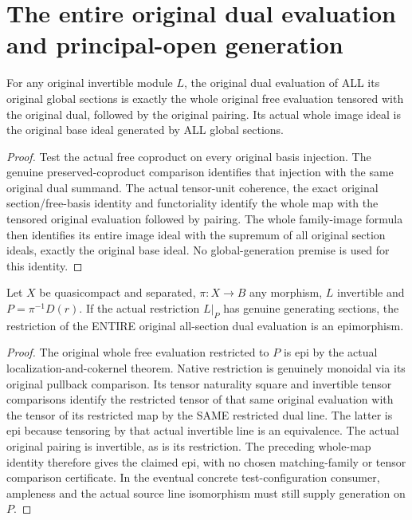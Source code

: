 \section{The entire original dual evaluation and principal-open generation}

\begin{lemma}
\label{lem:all-section-dual-evaluation}
\leanok
{}
For any original invertible module $L$, the original dual evaluation
of ALL its original global sections is exactly the whole original
free evaluation tensored with the original dual, followed by the
original pairing. Its actual whole image ideal is the original
base ideal generated by ALL global sections.
\end{lemma}
\begin{proof}
Test the actual free coproduct on every original basis injection.
The genuine preserved-coproduct comparison identifies that injection
with the same original dual summand. The actual tensor-unit
coherence, the exact original section/free-basis identity and
functoriality identify the whole map with the tensored original
evaluation followed by pairing. The whole family-image formula
then identifies its entire image ideal with the supremum of all
original section ideals, exactly the original base ideal. No
global-generation premise is used for this identity.
\end{proof}

\begin{proposition}
\label{prop:all-section-dual-evaluation-principal-epi}
\leanok
{}
Let $X$ be quasicompact and separated, $\pi:X\to B$ any morphism,
$L$ invertible and $P=\pi^{-1}D(r)$. If the actual restriction
$L|_P$ has genuine generating sections, the restriction of the
ENTIRE original all-section dual evaluation is an epimorphism.
\end{proposition}
\begin{proof}
The original whole free evaluation restricted to $P$ is epi by
the actual localization-and-cokernel theorem. Native restriction
is genuinely monoidal via its original pullback comparison.
Its tensor naturality square and invertible tensor comparisons
identify the restricted tensor of that same original evaluation
with the tensor of its restricted map by the SAME restricted dual
line. The latter is epi because tensoring by that actual invertible
line is an equivalence. The actual original pairing is invertible,
as is its restriction. The preceding whole-map identity therefore
gives the claimed epi, with no chosen matching-family or tensor
comparison certificate. In the eventual concrete test-configuration
consumer, ampleness and the actual source line isomorphism must
still supply generation on $P$.
\end{proof}
